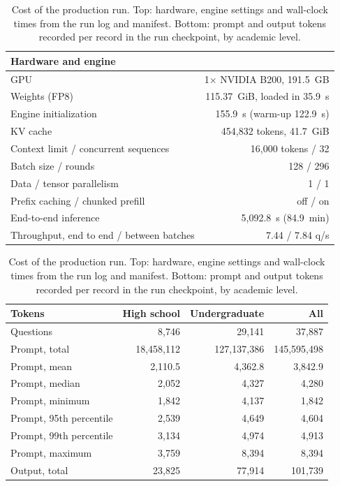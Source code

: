 \begin{table}[t]
\centering
\footnotesize
\setlength{\tabcolsep}{4pt}
\begin{tabular}{@{}lr@{}}
\toprule
Hardware and engine & \\
\midrule
GPU & 1$\times$ NVIDIA B200, 191.5~GB \\
Weights (FP8) & 115.37~GiB, loaded in 35.9~s \\
Engine initialization & 155.9~s (warm-up 122.9~s) \\
KV cache & 454,832 tokens, 41.7~GiB \\
Context limit / concurrent sequences & 16,000 tokens / 32 \\
Batch size / rounds & 128 / 296 \\
Data / tensor parallelism & 1 / 1 \\
Prefix caching / chunked prefill & off / on \\
End-to-end inference & 5,092.8~s (84.9~min) \\
Throughput, end to end / between batches & 7.44 / 7.84 q/s \\
\bottomrule
\end{tabular}

\medskip
\begin{tabular}{@{}lrrr@{}}
\toprule
Tokens & High school & Undergraduate & All \\
\midrule
Questions & 8,746 & 29,141 & 37,887 \\
Prompt, total & 18,458,112 & 127,137,386 & 145,595,498 \\
Prompt, mean & 2,110.5 & 4,362.8 & 3,842.9 \\
Prompt, median & 2,052 & 4,327 & 4,280 \\
Prompt, minimum & 1,842 & 4,137 & 1,842 \\
Prompt, 95th percentile & 2,539 & 4,649 & 4,604 \\
Prompt, 99th percentile & 3,134 & 4,974 & 4,913 \\
Prompt, maximum & 3,759 & 8,394 & 8,394 \\
Output, total & 23,825 & 77,914 & 101,739 \\
\bottomrule
\end{tabular}
\caption{Cost of the production run. Top: hardware, engine settings and
wall-clock times from the run log and manifest. Bottom: prompt and output
tokens recorded per record in the run checkpoint, by academic level.}
\label{tab:kc-cost}
\end{table}

